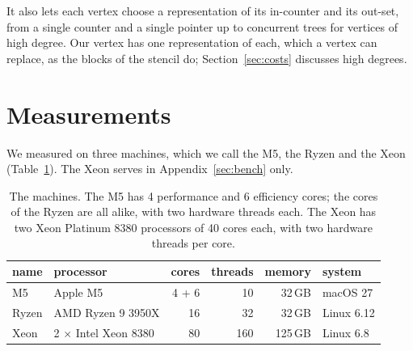 \documentclass[sigplan,nonacm]{acmart}
\begin{document}
It also lets each vertex choose a representation of its in-counter and
its out-set, from a single counter and a single pointer up to
concurrent trees for vertices of high degree.
%
Our vertex has one representation of each, which a vertex can replace,
as the blocks of the stencil do; Section~\ref{sec:costs} discusses
high degrees.

\section{Measurements}
\label{sec:perf}

We measured on three machines, which we call the M5, the Ryzen and the
Xeon (Table~\ref{tbl:machines}).
%
The Xeon serves in Appendix~\ref{sec:bench} only.

\begin{table}
\small
\setlength{\tabcolsep}{2.5pt}
\begin{tabular}{@{}llrrrl@{}}
name & processor & cores & threads & memory & system \\
\hline
M5 & Apple M5 & 4 + 6 & 10 & 32\,GB & macOS 27 \\
Ryzen & AMD Ryzen 9 3950X & 16 & 32 & 32\,GB & Linux 6.12 \\
Xeon & 2 $\times$ Intel Xeon 8380 & 80 & 160 & 125\,GB & Linux 6.8 \\
\end{tabular}
\caption{The machines.  The M5 has 4 performance and 6 efficiency
  cores; the cores of the Ryzen are all alike, with two hardware
  threads each.  The Xeon has two Xeon Platinum 8380 processors of 40
  cores each, with two hardware threads per core.}
\label{tbl:machines}
\end{table}
\end{document}
